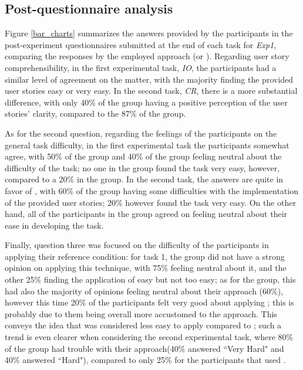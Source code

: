 \subsection{Post-questionnaire analysis}
Figure \ref{bar_charts} summarizes the answers provided by the participants in the post-experiment questionnaires submitted at the end of each task for \textit{Exp1}, comparing the responses by the employed approach (\tdd or \notdd).
Regarding user story comprehensibility, in the first experimental task, \textit{IO}, the participants had a similar level of agreement on the matter, with the majority finding the provided user stories easy or very easy. In the second task, \textit{CR}, there is a more substantial difference, with only 40\% of the \tdd group having a positive perception of the user stories' clarity, compared to the 87\% of the \notdd group.

As for the second question, regarding the feelings of the participants on the general task difficulty, in the first experimental task the participants somewhat agree, with 50\% of the \tdd group and 40\% of the \notdd group feeling neutral about the difficulty of the task; no one in the \tdd group found the task very easy, however, compared to a 20\% in the \notdd group. In the second task, the answers are quite in favor of \notdd, with 60\% of the \tdd group having some difficulties with the implementation of the provided user stories; 20\% however found the task very easy. On the other hand, all of the participants in the \notdd group agreed on feeling neutral about their ease in developing the task.

Finally, question three was focused on the difficulty of the participants in applying their reference condition: for task 1, the \tdd group did not have a strong opinion on applying this technique, with 75\% feeling neutral about it, and the other 25\% finding the application of \tdd easy but not too easy; as for the \notdd group, this had also the majority of opinions feeling neutral about their approach (60\%), however this time 20\% of the participants felt very good about applying \notdd; this is probably due to them being overall more accustomed to the approach. This conveys the idea that \tdd was considered less easy to apply compared to \notdd; such a trend is even clearer when considering the second experimental task, where 80\% of the \tdd group had trouble with their approach(40\% answered ``Very Hard" and 40\% answered ``Hard"), compared to only 25\% for the participants that used \notdd.


